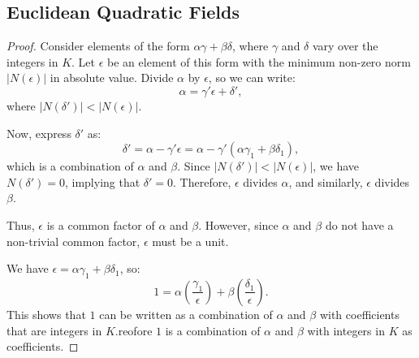 \documentclass{article}
\begin{document}
\subsection{Euclidean Quadratic Fields}




\begin{proof}
    Consider elements of the form \( \alpha \gamma + \beta \delta \), where \( \gamma \) and \( \delta \) vary over the integers in \( K \). Let \( \epsilon \) be an element of this form with the minimum non-zero norm \( |N(\epsilon)| \) in absolute value. Divide \( \alpha \) by \( \epsilon \), so we can write:
    \[
    \alpha = \gamma' \epsilon + \delta',
    \]
    where \( |N(\delta')| < |N(\epsilon)| \).
    
    Now, express \( \delta' \) as:
    \[
    \delta' = \alpha - \gamma' \epsilon = \alpha - \gamma' (\alpha \gamma_1 + \beta \delta_1),
    \]
    which is a combination of \( \alpha \) and \( \beta \). Since \( |N(\delta')| < |N(\epsilon)| \), we have \( N(\delta') = 0 \), implying that \( \delta' = 0 \). Therefore, \( \epsilon \) divides \( \alpha \), and similarly, \( \epsilon \) divides \( \beta \).
    
    Thus, \( \epsilon \) is a common factor of \( \alpha \) and \( \beta \). However, since \( \alpha \) and \( \beta \) do not have a non-trivial common factor, \( \epsilon \) must be a unit. 
    
    We have \( \epsilon = \alpha \gamma_1 + \beta \delta_1 \), so:
    \[
    1 = \alpha \left( \frac{\gamma_1}{\epsilon} \right) + \beta \left( \frac{\delta_1}{\epsilon} \right).
    \]
    This shows that \( 1 \) can be written as a combination of \( \alpha \) and \( \beta \) with coefficients that are integers in \( K \).reofore $1$ is a combination of $\alpha$ and $\beta$ with integers in $K$ as coefficients.

\end{proof}
\end{document}
